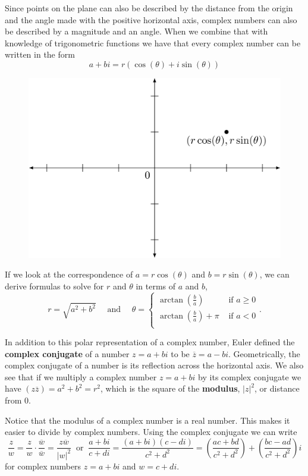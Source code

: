 \documentclass[
]{book}
\theoremstyle{definition}
\theoremstyle{definition}
\theoremstyle{definition}
\theoremstyle{definition}
\theoremstyle{remark}
\begin{document}
Since points on the plane can also be described by the distance from the origin and the angle made with the positive horizontal axis, complex numbers can also be described by a magnitude and an angle. When we combine that with knowledge of trigonometric functions we have that every complex number can be written in the form
\[a+bi = r(\cos(\theta) + i \sin(\theta))\]

\begin{figure}

{\centering \includegraphics[width=0.6\linewidth]{tikz/complex-polar} 

}

\end{figure}

If we look at the correspondence of \(a=r\cos(\theta)\) and \(b=r\sin(\theta)\), we can derive formulas to solve for \(r\) and \(\theta\) in terms of \(a\) and \(b\),
\[r= \sqrt{a^2+b^2} \quad \mbox{ and } \quad \theta = \begin{cases} \arctan\left(\frac{b}{a}\right) & \mbox{ if } a\geq 0 \\
\arctan\left(\frac{b}{a}\right)+\pi & \mbox{ if } a<0\\
\end{cases}.\]

In addition to this polar representation of a complex number, Euler defined the \textbf{complex conjugate} of a number \(z=a+bi\) to be \(\overline{z}=a-bi\). Geometrically, the complex conjugate of a number is its reflection across the horizontal axis. We also see that if we multiply a complex number \(z=a+bi\) by its complex conjugate we have \((z\overline{z}) = a^2+b^2=r^2\), which is the square of the \textbf{modulus}, \(|z|^2\), or distance from \(0\).

Notice that the modulus of a complex number is a real number. This makes it easier to divide by complex numbers. Using the complex conjugate we can write
\[\frac{z}{w} = \frac{z}{w} \cdot \frac{\overline{w}}{\overline{w}} = \frac{z\overline{w}}{|w|^2} \:  \mbox{ or } \: \frac{a+bi}{c+di} = \frac{(a+bi)(c-di)}{c^2+d^2} = \left(\frac{ac+bd}{c^2+d^2}\right) + \left(\frac{bc-ad}{c^2+d^2}\right) i\] for complex numbers \(z=a+bi\) and \(w=c+di\).
\end{document}
